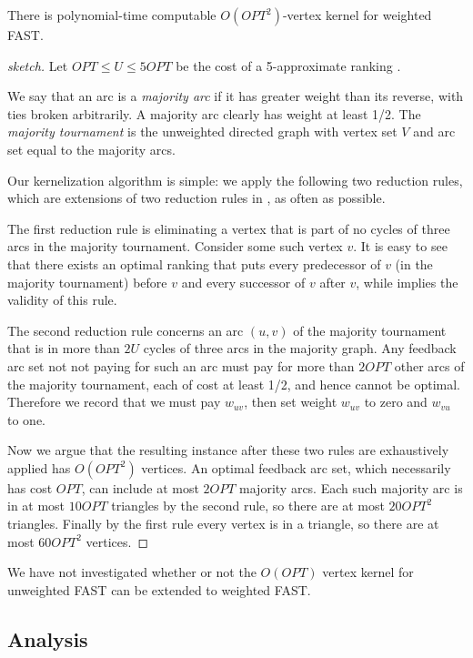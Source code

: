 \documentclass[envcountsame,oribibl]{llncs}
\begin{document}
\begin{lemma}\label{lem:kernel}
There is polynomial-time computable $O(OPT^2)$-vertex kernel for weighted FAST. 
\end{lemma}
\begin{proof}[sketch]
Let $OPT \le U \le 5OPT$ be the cost of a 5-approximate ranking \cite{Coppersmith06}.

We say that an arc is a \emph{majority arc} if it has greater weight than its reverse, with ties broken arbitrarily. A majority arc clearly has weight at least 1/2. The \emph{majority tournament} \cite{Ailon08aggregating} is the unweighted directed graph with vertex set $V$ and arc set equal to the majority arcs.

Our kernelization algorithm is simple: we apply the following two reduction rules, which are extensions of two reduction rules in \cite{Dom06}, as often as possible.

The first reduction rule is eliminating a vertex that is part of no cycles of three arcs in the majority tournament. Consider some such vertex $v$. It is easy to see that there exists an optimal ranking that puts every predecessor of $v$ (in the majority tournament) before $v$ and every successor of $v$ after $v$, while implies the validity of this rule.

The second reduction rule concerns an arc $(u,v)$ of the majority tournament that is in more than $2U$ cycles of three arcs in the majority graph. Any feedback arc set not not paying for such an arc must pay for more than $2OPT$ other arcs of the majority tournament, each of cost at least 1/2, and hence cannot be optimal. Therefore we record that we must pay $w_{uv}$, then set weight $w_{uv}$ to zero and $w_{vu}$ to one.

Now we argue that the resulting instance after these two rules are exhaustively applied has $O(OPT^2)$ vertices.
An optimal feedback arc set, which necessarily has cost $OPT$, can include at most $2OPT$ majority arcs. 
Each such majority arc is in at most $10OPT$ triangles by the second rule, so there are at most $20OPT^2$ triangles.
Finally by the first rule every vertex is in a triangle, so there are at most $60OPT^2$ vertices.
\end{proof}

We have not investigated whether or not the $O(OPT)$ vertex kernel for unweighted FAST \cite{Bessy09} can be extended to weighted FAST.

\subsection{Analysis}  \label{sec:fastAnalysis}
\end{document}

